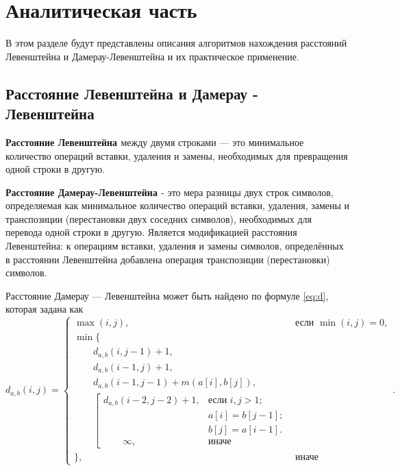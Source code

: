 \chapter{Аналитическая часть}
В этом разделе будут представлены описания алгоритмов нахождения расстояний Левенштейна и Дамерау-Левенштейна и их практическое применение.

\section{Расстояние Левенштейна и Дамерау - Левенштейна}

\textbf{Расстояние Левенштейна \cite{Levenshtein}} между двумя строками — это минимальное количество операций вставки, удаления и замены, необходимых для превращения одной строки в другую.

\textbf{Расстояние Дамерау-Левенштейна \cite{Dameray_Levenshtein}} - это мера разницы двух строк символов, определяемая как минимальное количество операций вставки, удаления, замены и транспозиции (перестановки двух соседних символов), необходимых для перевода одной строки в другую. Является модификацией расстояния Левенштейна: к операциям вставки, удаления и замены символов, определённых в расстоянии Левенштейна добавлена операция транспозиции (перестановки) символов.

Расстояние Дамерау — Левенштейна может быть найдено по формуле \ref{eq:d}, которая задана как
\begin{equation}
	\label{eq:d}
	d_{a,b}(i, j) = \begin{cases}
		\max(i, j), &\text{если }\min(i, j) = 0,\\
		\min \lbrace \\
			\qquad d_{a,b}(i, j-1) + 1,\\
			\qquad d_{a,b}(i-1, j) + 1,\\
			\qquad d_{a,b}(i-1, j-1) + m(a[i], b[j]), \\
			\qquad \left[ \begin{array}{cc}d_{a,b}(i-2, j-2) + 1, &\text{если }i,j > 1;\\
			\qquad &\text{}a[i] = b[j-1]; \\
			\qquad &\text{}b[j] = a[i-1].\\
			\qquad \infty, & \text{иначе}\end{array}\right.\\
		\rbrace, &\text{иначе}
		\end{cases}.
\end{equation}

